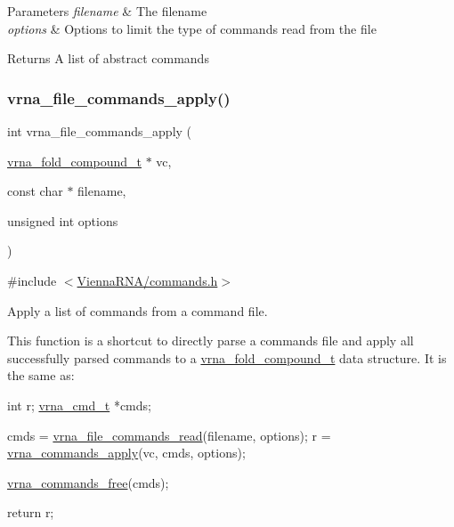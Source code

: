 \begin{DoxyParams}{Parameters}
{\em filename} & The filename \\
\hline
{\em options} & Options to limit the type of commands read from the file \\
\hline
\end{DoxyParams}
\begin{DoxyReturn}{Returns}
A list of abstract commands 
\end{DoxyReturn}
\mbox{\label{group__file__utils_gadbe8c9622f7bcc6dcbe3448b98df8656}} 
\subsubsection{\texorpdfstring{vrna\+\_\+file\+\_\+commands\+\_\+apply()}{vrna\_file\_commands\_apply()}}
{\footnotesize\ttfamily int vrna\+\_\+file\+\_\+commands\+\_\+apply (\begin{DoxyParamCaption}\item[{\hyperlink{group__fold__compound_ga1b0cef17fd40466cef5968eaeeff6166}{vrna\+\_\+fold\+\_\+compound\+\_\+t} $\ast$}]{vc,  }\item[{const char $\ast$}]{filename,  }\item[{unsigned int}]{options }\end{DoxyParamCaption})}



{\ttfamily \#include $<$\hyperlink{commands_8h}{Vienna\+R\+N\+A/commands.\+h}$>$}



Apply a list of commands from a command file. 

This function is a shortcut to directly parse a commands file and apply all successfully parsed commands to a \hyperlink{group__fold__compound_ga1b0cef17fd40466cef5968eaeeff6166}{vrna\+\_\+fold\+\_\+compound\+\_\+t} data structure. It is the same as\+: 
\begin{DoxyCodeInclude}
  \textcolor{keywordtype}{int}         r;
  \hyperlink{group__file__utils_structvrna__command__s}{vrna\_cmd\_t}  *cmds;

  cmds  = \hyperlink{group__file__utils_ga5d2a64331cff5b1059e7d327545d8a63}{vrna\_file\_commands\_read}(filename, options);
  r     = \hyperlink{group__file__utils_ga5e993fc4b9602af73aaaab4d3b3cd9a9}{vrna\_commands\_apply}(vc, cmds, options);

  \hyperlink{group__file__utils_ga926fd7632e68f3da2e2069402b80b1ab}{vrna\_commands\_free}(cmds);

  \textcolor{keywordflow}{return} r;
\end{DoxyCodeInclude}
 
